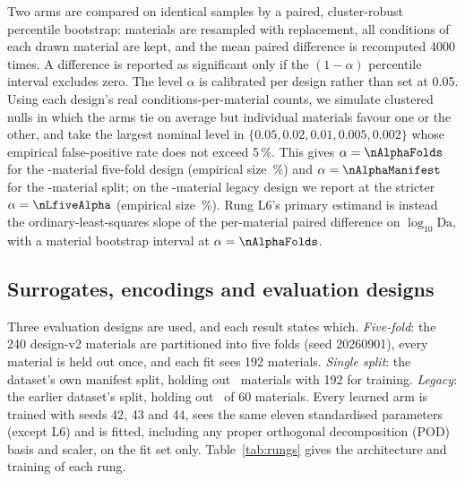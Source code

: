 Two arms are compared on identical samples by a paired, cluster-robust percentile
bootstrap: materials are resampled with replacement, all conditions of each drawn
material are kept, and the mean paired difference is recomputed 4000 times. A
difference is reported as significant only if the \((1-\alpha)\) percentile interval
excludes zero. The level \(\alpha\) is calibrated per design rather than set at 0.05.
Using each design's real conditions-per-material counts, we simulate clustered nulls in
which the arms tie on average but individual materials favour one or the other, and take
the largest nominal level in \(\{0.05, 0.02, 0.01, 0.005, 0.002\}\) whose empirical
false-positive rate does not exceed 5\,\%. This gives \(\alpha = \nAlphaFolds\) for the
\nNclustFolds-material five-fold design (empirical size \nFprFoldsCal\,\%) and
\(\alpha = \nAlphaManifest\) for the \nNclustManifest-material split; on the
\nNclustLegacy-material legacy design we report at the stricter \(\alpha = \nLfiveAlpha\)
(empirical size \nFprLegacyUsed\,\%).
Rung L6's primary estimand is instead the ordinary-least-squares slope of the
per-material paired difference on \(\log_{10}\mathrm{Da}\), with a material bootstrap
interval at \(\alpha = \nAlphaFolds\).

\subsection*{Surrogates, encodings and evaluation designs}

Three evaluation designs are used, and each result states which. \emph{Five-fold}: the
240 design-v2 materials are partitioned into five folds (seed 20260901), every material
is held out once, and each fit sees 192 materials. \emph{Single split}: the dataset's own
manifest split, holding out \nNclustManifest\ materials with 192 for training. \emph{Legacy}: the earlier dataset's split, holding out
\nNclustLegacy\ of 60 materials.
Every learned arm is trained with seeds 42, 43 and 44, sees the same eleven
standardised parameters (except L6) and is fitted, including any proper orthogonal
decomposition (POD) basis and scaler, on the fit set only.
Table~\ref{tab:rungs} gives the architecture and training of each rung.

